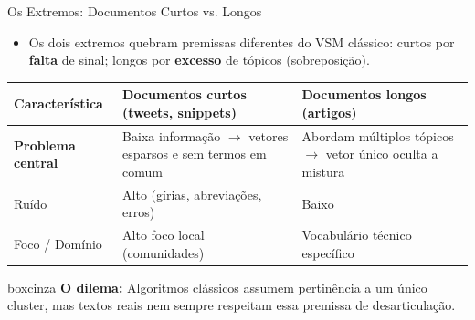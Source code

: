 \documentclass[aspectratio=43]{beamer}
\begin{document}
\begin{frame}[t]{Os Extremos: Documentos Curtos vs. Longos}

\vspace{0.1cm}

\begin{itemize}
    \item Os dois extremos quebram premissas diferentes do VSM clássico: curtos por \textbf{falta} de sinal; longos por \textbf{excesso} de tópicos (sobreposição).
\end{itemize}

\vspace{0.15cm}

\scriptsize
\renewcommand{\arraystretch}{1.2}
\begin{center}
\begin{tabular}{P{2.3cm} P{4.1cm} P{4.1cm}}
\hline
\textbf{Característica} & \textbf{Documentos curtos (tweets, snippets)} & \textbf{Documentos longos (artigos)} \\
\hline
\textbf{Problema central} & Baixa informação $\rightarrow$ vetores esparsos e sem termos em comum & Abordam múltiplos tópicos $\rightarrow$ vetor único oculta a mistura \\
Ruído & Alto (gírias, abreviações, erros) & Baixo \\
Foco / Domínio & Alto foco local (comunidades) & Vocabulário técnico específico \\
\hline
\end{tabular}
\end{center}

\vspace{0.1cm}

\begin{center}
\begin{beamercolorbox}[wd=0.85\paperwidth, sep=0.15cm]{boxcinza}
    \scriptsize \color{uelgreen} \textbf{O dilema:} Algoritmos clássicos assumem pertinência a um único cluster, mas textos reais nem sempre respeitam essa premissa de desarticulação.
\end{beamercolorbox}
\end{center}

\end{frame}
\end{document}
